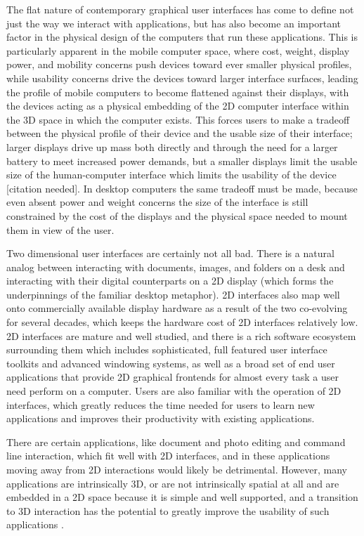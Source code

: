 The flat nature of contemporary graphical user interfaces has come to define not just the way we interact with applications, but has also become an important factor in the physical design of the computers that run these applications. This is particularly apparent in the mobile computer space, where cost, weight, display power, and mobility concerns push devices toward ever smaller physical profiles, while usability concerns drive the devices toward larger interface surfaces, leading the profile of mobile computers to become flattened against their displays, with the devices acting as a physical embedding of the 2D computer interface within the 3D space in which the computer exists. This forces users to make a tradeoff between the physical profile of their device and the usable size of their interface; larger displays drive up mass both directly and through the need for a larger battery to meet increased power demands, but a smaller displays limit the usable size of the human-computer interface which limits the usability of the device [citation needed]. In desktop computers the same tradeoff must be made, because even absent power and weight concerns the size of the interface is still constrained by the cost of the displays and the physical space needed to mount them in view of the user.

Two dimensional user interfaces are certainly not all bad. There is a natural analog between interacting with documents, images, and folders on a desk and interacting with their digital counterparts on a 2D display (which forms the underpinnings of the familiar desktop metaphor). 2D interfaces also map well onto commercially available display hardware as a result of the two co-evolving for several decades, which keeps the hardware cost of 2D interfaces relatively low. 2D interfaces are mature and well studied, and there is a rich software ecosystem surrounding them which includes sophisticated, full featured user interface toolkits and advanced windowing systems, as well as a broad set of end user applications that provide 2D graphical frontends for almost every task a user need perform on a computer. Users are also familiar with the operation of 2D interfaces, which greatly reduces the time needed for users to learn new applications and improves their productivity with existing applications. 

There are certain applications, like document and photo editing and command line interaction, which fit well with 2D interfaces, and in these applications moving away from 2D interactions would likely be detrimental. However, many applications are intrinsically 3D, or are not intrinsically spatial at all and are embedded in a 2D space because it is simple and well supported, and a transition to 3D interaction has the potential to greatly improve  the usability of such applications \cite{bowman_theory_practice}.

